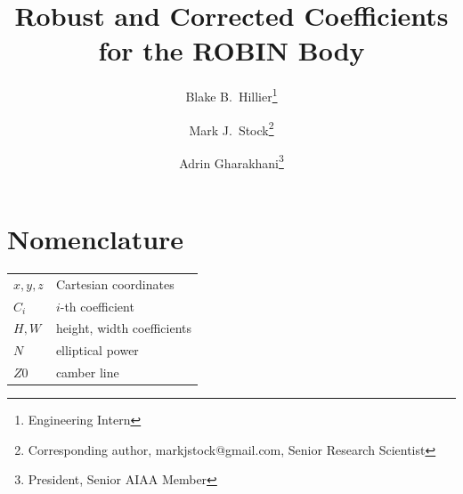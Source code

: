 \documentclass[journal]{new-aiaa}
\title{Robust and Corrected Coefficients for the ROBIN Body}
\author{Blake B.~Hillier\footnote{Engineering Intern}}
\author{Mark J.~Stock\footnote{Corresponding author, markjstock@gmail.com, Senior Research Scientist}}
\author{Adrin Gharakhani\footnote{President, Senior AIAA Member}}
\affil{Applied Scientific Research, Inc.\\ Irvine, CA}
\begin{document}
\maketitle


\section*{Nomenclature}

{\renewcommand\arraystretch{1.0}
\noindent\begin{longtable*}{@{}l @{\quad=\quad} l@{}}
$x,y,z$  & Cartesian coordinates \\
$C_{i}$ &    $i$-th coefficient \\
$H,W$ &    height, width coefficients \\
$N$ &    elliptical power \\
$Z0$ &    camber line \\
\end{longtable*}}

\end{document}
